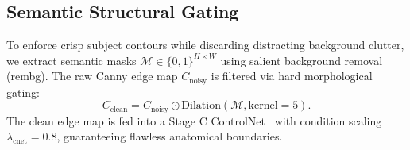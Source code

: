 \subsection{Semantic Structural Gating}
\label{subsec:canny}
To enforce crisp subject contours while discarding distracting background clutter, we extract semantic masks $\mathcal{M} \in \{0, 1\}^{H \times W}$ using salient background removal (rembg). The raw Canny edge map $C_{\text{noisy}}$ is filtered via hard morphological gating:
\begin{equation}
    C_{\text{clean}} = C_{\text{noisy}} \odot \text{Dilation}(\mathcal{M}, \text{kernel}=5).
\end{equation}
The clean edge map is fed into a Stage C ControlNet~\cite{controlNet} with condition scaling $\lambda_{\text{cnet}} = 0.8$, guaranteeing flawless anatomical boundaries.
